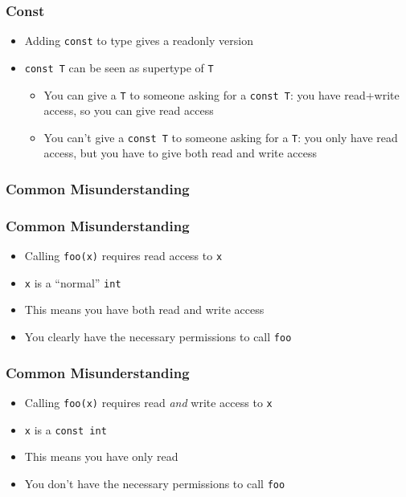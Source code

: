 \begin{frame}
  \frametitle{Const}
  \begin{itemize}
    \item Adding {\tt const} to type gives a readonly version
    \item {\tt const T} can be seen as supertype of {\tt T}
      \begin{itemize}
        \item You can give a {\tt T} to someone asking for a {\tt const T}:
              you have read+write access, so you can give read access
        \item You can't give a {\tt const T} to someone asking for a {\tt T}:
              you only have read access, but you have to give both read and write access
      \end{itemize}
  \end{itemize}
\end{frame}

\begin{frame}
  \frametitle{Common Misunderstanding}
  \begin{center}
  \end{center}
\end{frame}

\begin{frame}
  \frametitle{Common Misunderstanding}
  \begin{itemize}
    \item Calling \texttt{foo(x)} requires read access to \texttt{x}
    \item \texttt{x} is a ``normal'' \texttt{int}
    \item This means you have both read and write access
    \item You clearly have the necessary permissions to call \texttt{foo}
  \end{itemize}
\end{frame}

\begin{frame}
  \frametitle{Common Misunderstanding}
  \begin{itemize}
    \item Calling \texttt{foo(x)} requires read \emph{and} write access to \texttt{x}
    \item \texttt{x} is a \texttt{const int}
    \item This means you have only read
    \item You don't have the necessary permissions to call \texttt{foo}
  \end{itemize}
\end{frame}

